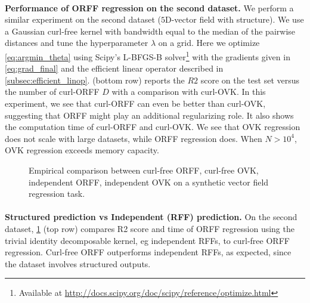 \paragraph{}
\textbf{Performance of ORFF regression on the second dataset.} 
We perform a similar experiment on the second dataset ($5$D-vector field with
structure). We use a Gaussian curl-free kernel with bandwidth equal to the
median of the pairwise distances and tune the hyperparameter $\lambda$ on a
grid. Here we optimize \cref{eq:argmin_theta} using Scipy's \acs{L-BFGS-B}
\citep{byrd1995limited} solver\footnote{Available at
\url{http://docs.scipy.org/doc/scipy/reference/optimize.html}} with the
gradients given in \cref{eq:grad_final} and the efficient linear operator
described in \cref{subsec:efficient_linop}.   (bottom
row) reports the $R2$ score on the test set versus the number of
curl-\acs{ORFF} $D$ with a comparison with curl-\acs{OVK}.  In this experiment,
we see that curl-\acs{ORFF} can even be better than curl-\acs{OVK}, suggesting
that \acs{ORFF} might play an additional regularizing role. It also shows the
computation time of curl-\acs{ORFF} and curl-\acs{OVK}. We see that \acs{OVK}
regression does not scale with large datasets, while \acs{ORFF} regression
does. When $N>10^4$, \acs{OVK} regression exceeds memory capacity.
\begin{figure}
    \centering
    \resizebox{\textwidth}{!}{}
    \caption{Empirical comparison between curl-free ORFF, curl-free OVK,
    independent ORFF, independent OVK on a synthetic vector field regression
    task. \label{fig:curl_experiment}}
\end{figure}
\paragraph{}
\textbf{Structured prediction vs Independent (RFF) prediction.}
On the second dataset, \cref{fig:curl_experiment} (top row) compares R2 score
and time of \acs{ORFF} regression using the trivial identity decomposable
kernel, \acs{eg} independent \acsp{RFF}, to curl-free \acs{ORFF} regression.
Curl-free \acs{ORFF} outperforms independent \acsp{RFF}, as expected, since the
dataset involves structured outputs.
